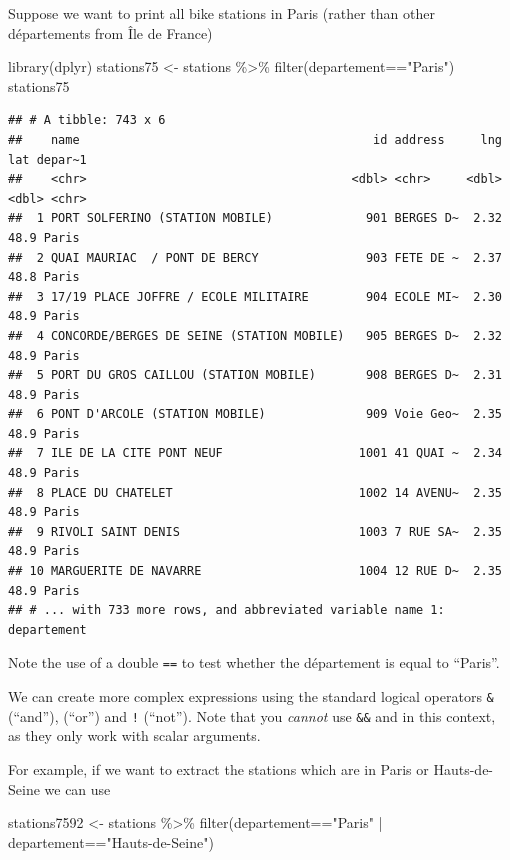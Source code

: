 \documentclass[
]{book}
\newenvironment{Shaded}{\begin{snugshade}}{\end{snugshade}}
\newcommand{\FunctionTok}[1]{\textcolor[rgb]{0.00,0.00,0.00}{#1}}
\newcommand{\NormalTok}[1]{#1}
\newcommand{\OtherTok}[1]{\textcolor[rgb]{0.56,0.35,0.01}{#1}}
\newcommand{\SpecialCharTok}[1]{\textcolor[rgb]{0.00,0.00,0.00}{#1}}
\newcommand{\StringTok}[1]{\textcolor[rgb]{0.31,0.60,0.02}{#1}}
\begin{document}
Suppose we want to print all bike stations in Paris (rather than other départements from Île de France)

\begin{Shaded}
\begin{Highlighting}[]
\FunctionTok{library}\NormalTok{(dplyr)}
\NormalTok{stations75 }\OtherTok{\textless{}{-}}\NormalTok{ stations }\SpecialCharTok{\%\textgreater{}\%}
                \FunctionTok{filter}\NormalTok{(departement}\SpecialCharTok{==}\StringTok{"Paris"}\NormalTok{)}
\NormalTok{stations75}
\end{Highlighting}
\end{Shaded}

\begin{verbatim}
## # A tibble: 743 x 6
##    name                                         id address     lng   lat depar~1
##    <chr>                                     <dbl> <chr>     <dbl> <dbl> <chr>  
##  1 PORT SOLFERINO (STATION MOBILE)             901 BERGES D~  2.32  48.9 Paris  
##  2 QUAI MAURIAC  / PONT DE BERCY               903 FETE DE ~  2.37  48.8 Paris  
##  3 17/19 PLACE JOFFRE / ECOLE MILITAIRE        904 ECOLE MI~  2.30  48.9 Paris  
##  4 CONCORDE/BERGES DE SEINE (STATION MOBILE)   905 BERGES D~  2.32  48.9 Paris  
##  5 PORT DU GROS CAILLOU (STATION MOBILE)       908 BERGES D~  2.31  48.9 Paris  
##  6 PONT D'ARCOLE (STATION MOBILE)              909 Voie Geo~  2.35  48.9 Paris  
##  7 ILE DE LA CITE PONT NEUF                   1001 41 QUAI ~  2.34  48.9 Paris  
##  8 PLACE DU CHATELET                          1002 14 AVENU~  2.35  48.9 Paris  
##  9 RIVOLI SAINT DENIS                         1003 7 RUE SA~  2.35  48.9 Paris  
## 10 MARGUERITE DE NAVARRE                      1004 12 RUE D~  2.35  48.9 Paris  
## # ... with 733 more rows, and abbreviated variable name 1: departement
\end{verbatim}

Note the use of a double \texttt{==} to test whether the département is equal to ``Paris''.

We can create more complex expressions using the standard logical operators \texttt{\&} (``and''), \texttt{\textbar{}} (``or'') and \texttt{!} (``not''). Note that you \emph{cannot} use \texttt{\&\&} and \texttt{\textbar{}\textbar{}} in this context, as they only work with scalar arguments.

For example, if we want to extract the stations which are in Paris or Hauts-de-Seine we can use

\begin{Shaded}
\begin{Highlighting}[]
\NormalTok{stations7592 }\OtherTok{\textless{}{-}}\NormalTok{ stations }\SpecialCharTok{\%\textgreater{}\%}
                  \FunctionTok{filter}\NormalTok{(departement}\SpecialCharTok{==}\StringTok{"Paris"} \SpecialCharTok{|}\NormalTok{ departement}\SpecialCharTok{==}\StringTok{"Hauts{-}de{-}Seine"}\NormalTok{)}
\end{Highlighting}
\end{Shaded}
\end{document}
